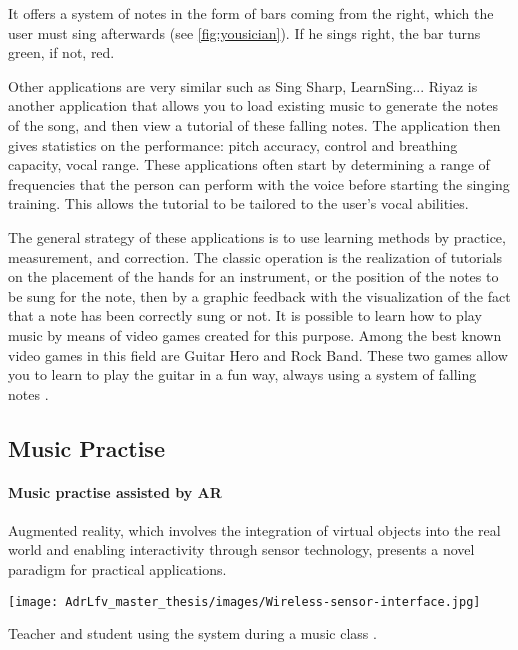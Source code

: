It offers a system of notes in the form of bars coming from the right, which the user must sing afterwards (see \ref{fig:yousician}). If he sings right, the bar turns green, if not, red.

Other applications are very similar such as Sing Sharp, LearnSing... Riyaz is another application that allows you to load existing music to generate the notes of the song, and then view a tutorial of these falling notes.
The application then gives statistics on the performance: pitch accuracy, control and breathing capacity, vocal range. These applications often start by determining a range of frequencies that the person can perform with the voice before starting the singing training. This allows the tutorial to be tailored to the user’s vocal abilities.

The general strategy of these applications is to use learning methods by practice, measurement, and correction. The classic operation is the realization of tutorials on the placement of the hands for an instrument, or the position of the notes to be sung for the note, then by a graphic feedback with the visualization of the fact that a note has been correctly sung or not.
It is possible to learn how to play music by means of video games created for this purpose. Among the best known video games in this field are Guitar Hero and Rock Band. These two games allow you to learn to play the guitar in a fun way, always using a system of falling notes \cite{farrugia2015tunes}.

\subsection{Music Practise}

\paragraph{Music practise assisted by AR}

Augmented reality, which involves the integration of virtual objects into the real world and enabling interactivity through sensor technology, presents a novel paradigm for practical applications.

\begin{marginfigure}
    \centering
    \texttt{[image: AdrLfv\_master\_thesis/images/Wireless-sensor-interface.jpg]}
    \caption{Teacher and student using the system during a music class \cite{bevilacqua2007wireless}.}
    \label{fig:Wireless-sensor-interface}
\end{marginfigure}

